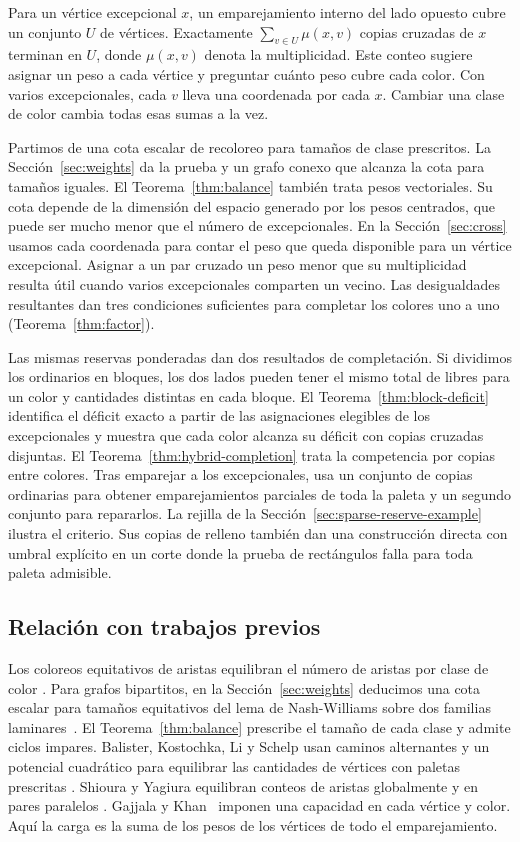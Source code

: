 \documentclass[11pt]{article}
\begin{document}
Para un vértice excepcional \(x\), un emparejamiento interno del lado opuesto cubre un conjunto \(U\) de vértices. Exactamente \(\sum_{v\in U}\mu(x,v)\) copias cruzadas de \(x\) terminan en \(U\), donde \(\mu(x,v)\) denota la multiplicidad. Este conteo sugiere asignar un peso a cada vértice y preguntar cuánto peso cubre cada color. Con varios excepcionales, cada \(v\) lleva una coordenada por cada \(x\). Cambiar una clase de color cambia todas esas sumas a la vez.

Partimos de una cota escalar de recoloreo para tamaños de clase prescritos. La Sección~\ref{sec:weights} da la prueba y un grafo conexo que alcanza la cota para tamaños iguales. El Teorema~\ref{thm:balance} también trata pesos vectoriales. Su cota depende de la dimensión del espacio generado por los pesos centrados, que puede ser mucho menor que el número de excepcionales. En la Sección~\ref{sec:cross} usamos cada coordenada para contar el peso que queda disponible para un vértice excepcional. Asignar a un par cruzado un peso menor que su multiplicidad resulta útil cuando varios excepcionales comparten un vecino. Las desigualdades resultantes dan tres condiciones suficientes para completar los colores uno a uno (Teorema~\ref{thm:factor}).

Las mismas reservas ponderadas dan dos resultados de completación. Si dividimos los ordinarios en bloques, los dos lados pueden tener el mismo total de libres para un color y cantidades distintas en cada bloque. El Teorema~\ref{thm:block-deficit} identifica el déficit exacto a partir de las asignaciones elegibles de los excepcionales y muestra que cada color alcanza su déficit con copias cruzadas disjuntas. El Teorema~\ref{thm:hybrid-completion} trata la competencia por copias entre colores. Tras emparejar a los excepcionales, usa un conjunto de copias ordinarias para obtener emparejamientos parciales de toda la paleta y un segundo conjunto para repararlos. La rejilla de la Sección~\ref{sec:sparse-reserve-example} ilustra el criterio. Sus copias de relleno también dan una construcción directa con umbral explícito en un corte donde la prueba de rectángulos falla para toda paleta admisible.

\subsection*{Relación con trabajos previos}

Los coloreos equitativos de aristas equilibran el número de aristas por clase de color \cite{McDiarmid,CariolaroFu}. Para grafos bipartitos, en la Sección~\ref{sec:weights} deducimos una cota escalar para tamaños equitativos del lema de Nash-Williams sobre dos familias laminares~\cite{NashWilliams}. El Teorema~\ref{thm:balance} prescribe el tamaño de cada clase y admite ciclos impares. Balister, Kostochka, Li y Schelp usan caminos alternantes y un potencial cuadrático para equilibrar las cantidades de vértices con paletas prescritas \cite{BKLS}. Shioura y Yagiura equilibran conteos de aristas globalmente y en pares paralelos \cite{SY}. Gajjala y Khan~\cite{GK} imponen una capacidad en cada vértice y color. Aquí la carga es la suma de los pesos de los vértices de todo el emparejamiento.
\end{document}
